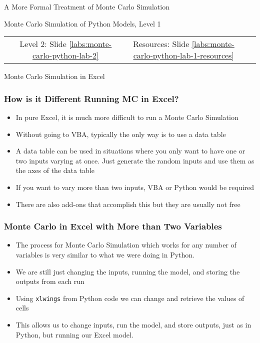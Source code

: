 \documentclass[handout, 11pt]{beamer}
\begin{document}
\begin{section}[Formal MC]{A More Formal Treatment of Monte Carlo Simulation}
\begin{frame}
{\begin{block}{Monte Carlo Simulation of Python Models, Level 1}
\begin{enumerate}
\end{enumerate}
\vfill
\begin{tabular*}{\textwidth}{@{\extracolsep{\fill}}cccc}
\toprule
\hfill & Level 2: Slide \textcolor{blue}{\underline{\ref{labs:monte-carlo-python-lab-2}}} & Resources: Slide \textcolor{blue}{\underline{\ref{labs:monte-carlo-python-lab-1-resources}}} & \hfill\\

\end{tabular*}
\end{block}
}
\label{labs:monte-carlo-python-lab-1}
\end{frame}
\end{section}
\begin{section}[Excel MC]{Monte Carlo Simulation in Excel}
\begin{frame}
\frametitle{How is it Different Running MC in Excel?}
\begin{itemize}
\item In pure Excel, it is much more difficult to run a Monte Carlo Simulation
\vfill
\item Without going to VBA, typically the only way is to use a data table
\vfill
\item A data table can be used in situations where you only want to have one or two inputs varying at once. Just generate the random inputs and use them as the axes of the data table
\vfill
\item If you want to vary more than two inputs, VBA or Python would be required
\vfill
\item There are also add-ons that accomplish this but they are usually not free
\end{itemize}
\end{frame}
\begin{frame}
\frametitle{Monte Carlo in Excel with More than Two Variables}
\begin{itemize}
\item The process for Monte Carlo Simulation which works for any number of variables is very similar to what we were doing in Python.
\vfill
\item We are still just changing the inputs, running the model, and storing the outputs from each run
\vfill
\item Using
\texttt{xlwings}
from Python code we can change and retrieve the values of cells
\vfill
\item This allows us to change inputs, run the model, and store outputs, just as in Python, but running our Excel model.
\vfill

\end{itemize}
\end{frame}
\end{section}
\end{document}
